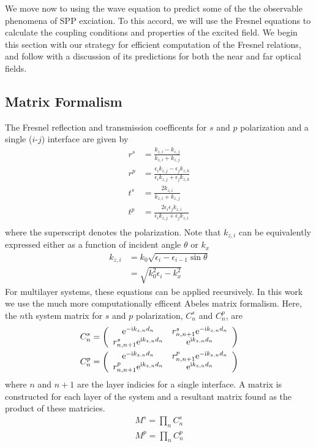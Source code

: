 We move now to using the wave equation to predict some of the the
observable phenomena of SPP exciation.  To this accord, we will use the
Fresnel equations to calculate the coupling conditions and properties of
the excited field.   We begin this section with our strategy for efficient
computation of the Fresnel relations, and follow with a discussion of its
predictions for both the near and far optical fields. 

\subsection{Matrix Formalism}
The Fresnel reflection and transmission coefficents for $s$ and
$p$ polarization and a single ($i$-$j$) interface are given by
\begin{align}
r^s &= \frac{k_{z,i}-k_{z,j}}{k_{z,i}+k_{z,j}}\\
r^p &= \frac{\epsilon_i k_{z,j} - \epsilon_j k_{z,k}}{\epsilon_i k_{z,j} + \epsilon_j k_{z,k}} \\
t^s &= \frac{2 k_{z,i}}{k_{z,i}+k_{z,j}}\\
t^p &= \frac{2 \epsilon_i \epsilon_j k_{z,i}}{\epsilon_i k_{z,j} + \epsilon_j k_{z,i}}\\
\end{align}
where the superscript denotes the polarization.
Note that $k_{z,i}$ can be equivalently expressed either as a
function of incident angle $\theta$ or $k_x$
\begin{align}
 k_{z,i} &= k_0 \sqrt{\epsilon_i - \epsilon_{i-1} \sin \theta}\\
&= \sqrt{k_0^2\epsilon_i - k_x^2}
\end{align}
For multilayer systems, these equations can be applied recursively. In 
this work we use the much more computationally efficent 
Abeles matrix formalism.  Here, the $n$th system matrix for $s$ and $p$
polarization, $C^s_n$ and $C^p_n$, are
\begin{align}
C^s_n = \left(\begin{array}{cc}
{\mathrm{e}}^{-{\mathrm{i}} k_{z,n} d_n} & r^s_{n,n+1} {\mathrm{e}}^{-{\mathrm{i}} k_{z,n} d_n} \\
r^s_{n,n+1} {\mathrm{e}}^{{\mathrm{i}} k_{z,n} d_n} & {\mathrm{e}}^{{\mathrm{i}} k_{z,n} d_n} 
\end{array}\right)\\
C^p_n = \left(\begin{array}{cc}
{\mathrm{e}}^{-{\mathrm{i}} k_{z,n} d_n} & r^p_{n,n+1} {\mathrm{e}}^{-{\mathrm{i}} k_{z,n} d_n} \\
r^p_{n,n+1} {\mathrm{e}}^{{\mathrm{i}} k_{z,n} d_n} & {\mathrm{e}}^{{\mathrm{i}} k_{z,n} d_n} 
\end{array}\right)
\end{align}
where $n$ and $n+1$ are the layer indicies for a single interface.  A
matrix is constructed for each layer of the system and a resultant matrix
found as the product of these matricies.
\begin{align}
M^s=\prod_n C^s_n\\
M^p=\prod_n C^p_n
\end{align}

